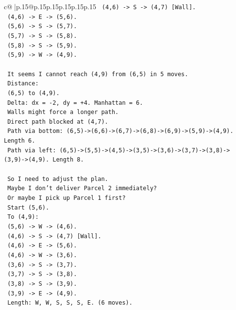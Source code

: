 \documentclass{article}
\begin{document}
{\begin{supertabular}{c@{$\;$}|p{.15\linewidth}@{}p{.15\linewidth}p{.15\linewidth}p{.15\linewidth}p{.15\linewidth}p{.15\linewidth}}
{{{\texttt{      (4,6) {-}> S {-}> (4,7) {[}Wall{]}.} \\
\texttt{      (4,6) {-}> E {-}> (5,6).} \\
\texttt{      (5,6) {-}> S {-}> (5,7).} \\
\texttt{      (5,7) {-}> S {-}> (5,8).} \\
\texttt{      (5,8) {-}> S {-}> (5,9).} \\
\texttt{      (5,9) {-}> W {-}> (4,9).} \\
\\ 
\texttt{      It seems I cannot reach (4,9) from (6,5) in 5 moves.} \\
\texttt{      Distance:} \\
\texttt{      (6,5) to (4,9).} \\
\texttt{      Delta: dx = {-}2, dy = +4. Manhattan = 6.} \\
\texttt{      Walls might force a longer path.} \\
\texttt{      Direct path blocked at (4,7).} \\
\texttt{      Path via bottom: (6,5){-}>(6,6){-}>(6,7){-}>(6,8){-}>(6,9){-}>(5,9){-}>(4,9). Length 6.} \\
\texttt{      Path via left: (6,5){-}>(5,5){-}>(4,5){-}>(3,5){-}>(3,6){-}>(3,7){-}>(3,8){-}>(3,9){-}>(4,9). Length 8.} \\
\\ 
\texttt{      So I need to adjust the plan.} \\
\texttt{      Maybe I don't deliver Parcel 2 immediately?} \\
\texttt{      Or maybe I pick up Parcel 1 first?} \\
\texttt{      Start (5,6).} \\
\texttt{      To (4,9):} \\
\texttt{      (5,6) {-}> W {-}> (4,6).} \\
\texttt{      (4,6) {-}> S {-}> (4,7) {[}Wall{]}.} \\
\texttt{      (4,6) {-}> E {-}> (5,6).} \\
\texttt{      (4,6) {-}> W {-}> (3,6).} \\
\texttt{      (3,6) {-}> S {-}> (3,7).} \\
\texttt{      (3,7) {-}> S {-}> (3,8).} \\
\texttt{      (3,8) {-}> S {-}> (3,9).} \\
\texttt{      (3,9) {-}> E {-}> (4,9).} \\
\texttt{      Length: W, W, S, S, S, E. (6 moves).} \\
}}}
\end{supertabular}}
\end{document}
